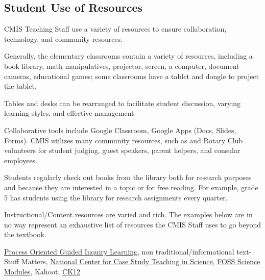 \documentclass{report}
\begin{document}
\subsection{Student Use of Resources}



\begin{findings}
CMIS Teaching Staff use a variety of resources to ensure collaboration, technology, and community resources. 

Generally, the elementary classrooms contain a variety of resources, including a book library, math manipulatives, projector, screen, a computer, document cameras, educational games; some classrooms have a tablet and dongle to project the tablet. 

Tables and desks can be rearranged to facilitate student discussion, varying learning styles, and effective management

Collaborative tools include Google Classroom, Google Apps (Docs, Slides, Forms). CMIS utilizes many community resources, such as and Rotary Club volunteers for student judging, guest speakers, parent helpers, and consular employees. 

Students regularly check out books from the library both for research purposes and  because they are interested in a topic or for free reading.  For example, grade 5 has students using the library for research assignments every quarter. 

Instructional/Content resources are varied and rich. The examples below are in no way represent an exhaustive list of resources the CMIS Staff uses to go beyond the textbook. 
 

\href{https://pogil.org/}{Process Oriented Guided Inquiry Learning}, non traditional/informational text- Stuff Matters, \href{http://sciencecases.lib.buffalo.edu/cs/}{National Center for Case Study Teaching in Science}, \href{https://docs.google.com/a/cmis.ac.th/document/d/16TR92UNODi6qAM_vZkqFmqV_NGde5JCabfIoimXw8EM/edit?usp=sharing}{FOSS Science Modules}, Kahoot, \href{http://www.ck12.org/}{CK12}


\end{findings}
\end{document}
